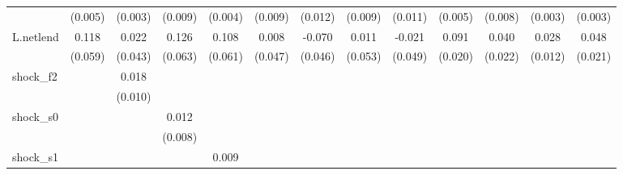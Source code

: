 {\begin{tabular}{l*{12}{c}}
            &     (0.005)         &     (0.003)         &     (0.009)         &     (0.004)         &     (0.009)         &     (0.012)         &     (0.009)         &     (0.011)         &     (0.005)         &     (0.008)         &     (0.003)         &     (0.003)         \\
\addlinespace
L.netlend   &       0.118\sym{*}  &       0.022         &       0.126\sym{*}  &       0.108\sym{*}  &       0.008         &      -0.070         &       0.011         &      -0.021         &       0.091\sym{***}&       0.040\sym{*}  &       0.028\sym{**} &       0.048\sym{**} \\
            &     (0.059)         &     (0.043)         &     (0.063)         &     (0.061)         &     (0.047)         &     (0.046)         &     (0.053)         &     (0.049)         &     (0.020)         &     (0.022)         &     (0.012)         &     (0.021)         \\
\addlinespace
shock\_f2    &                     &       0.018\sym{*}  &                     &                     &                     &                     &                     &                     &                     &                     &                     &                     \\
            &                     &     (0.010)         &                     &                     &                     &                     &                     &                     &                     &                     &                     &                     \\
\addlinespace
shock\_s0    &                     &                     &       0.012         &                     &                     &                     &                     &                     &                     &                     &                     &                     \\
            &                     &                     &     (0.008)         &                     &                     &                     &                     &                     &                     &                     &                     &                     \\
\addlinespace
shock\_s1    &                     &                     &                     &       0.009\sym{**} &                     &                     &                     &                     &                     &                     &                     &                     \\

\end{tabular}}
